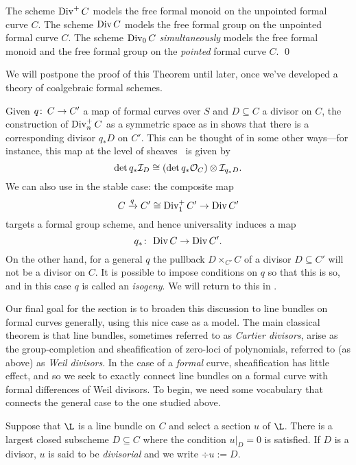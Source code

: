 \begin{theorem}\label{DivConstructionsAreFree}
The scheme $\operatorname{Div}^+ C$ models the free formal monoid on the unpointed formal curve $C$.  The scheme $\operatorname{Div} C$ models the free formal group on the unpointed formal curve $C$.  The scheme $\operatorname{Div}_0 C$ \emph{simultaneously} models the free formal monoid and the free formal group on the \emph{pointed} formal curve $C$. \qed
\end{theorem}
\noindent We will postpone the proof of this Theorem until later, once we've developed a theory of coalgebraic formal schemes.

\begin{remark}\label{DivHasPushforwards}
Given $q\colon\thinspace C \to C'$ a map of formal curves over $S$ and $D \subseteq C$ a divisor on $C$, the construction of $\operatorname{Div}_n^+ C$ as a symmetric space as in  shows that there is a corresponding divisor $q_* D$ on $C'$.  This can be thought of in some other ways---for instance, this map at the level of sheaves~\cite[Ch.\ IV, Exercise 2.6]{Hartshorne} is given by \[\det q_* \mathcal{I}_D \cong (\det q_* \mathcal{O}_C) \otimes \mathcal{I}_{q_* D}.\]  We can also use  in the stable case: the composite map \[C \xrightarrow{q} C' \cong \operatorname{Div}_1^+ C' \to \operatorname{Div} C'\] targets a formal group scheme, and hence universality induces a map \[q_*\colon\thinspace \operatorname{Div} C \to \operatorname{Div} C'.\]  On the other hand, for a general $q$ the pullback $D \times_{C'} C$ of a divisor $D \subseteq C'$ will not be a divisor on $C$.  It is possible to impose conditions on $q$ so that this is so, and in this case $q$ is called an \textit{isogeny}.  We will return to this in .
\end{remark}

Our final goal for the section is to broaden this discussion to line bundles on formal curves generally, using this nice case as a model.  The main classical theorem is that line bundles, sometimes referred to as \textit{Cartier divisors}, arise as the group-completion and sheafification of zero-loci of polynomials, referred to (as above) as \textit{Weil divisors}.  In the case of a \emph{formal} curve, sheafification has little effect, and so we seek to exactly connect line bundles on a formal curve with formal differences of Weil divisors.  To begin, we need some vocabulary that connects the general case to the one studied above.

\begin{definition}\label{DivisorialDefn}
Suppose that $\L$ is a line bundle on $C$ and select a section $u$ of $\L$.  There is a largest closed subscheme $D \subseteq C$ where the condition $u|_D = 0$ is satisfied.  If $D$ is a divisor, $u$ is said to be \textit{divisorial} and we write $\div u := D$.
\end{definition}

